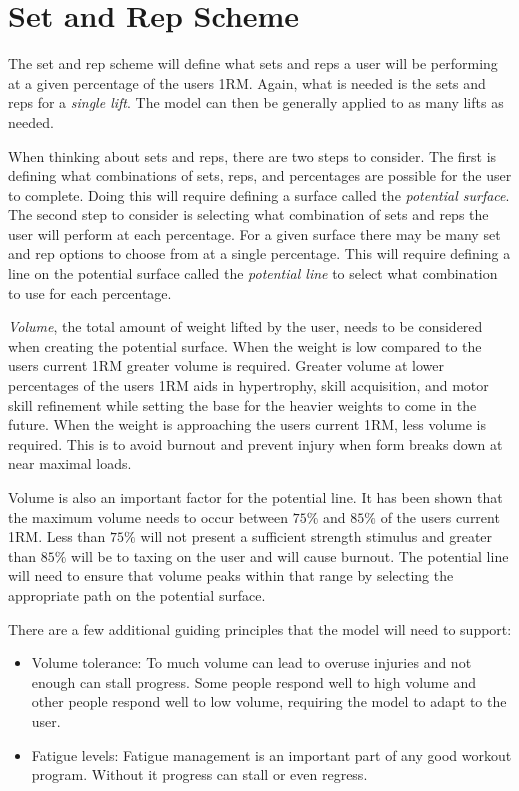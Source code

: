 \section{Set and Rep Scheme}

The set and rep scheme will define what sets and reps a user will be performing at a given percentage of the users 1RM. Again, what is needed is the sets and reps for a \textit{single lift}. The model can then be generally applied to as many lifts as needed.

When thinking about sets and reps, there are two steps to consider. The first is defining what combinations of sets, reps, and percentages are possible for the user to complete. Doing this will require defining a surface called the \textit{potential surface}. The second step to consider is selecting what combination of sets and reps the user will perform at each percentage. For a given surface there may be many set and rep options to choose from at a single percentage. This will require defining a line on the potential surface called the \textit{potential line} to select what combination to use for each percentage.

\textit{Volume}, the total amount of weight lifted by the user, needs to be considered when creating the potential surface. When the weight is low compared to the users current 1RM greater volume is required. Greater volume at lower percentages of the users 1RM aids in hypertrophy, skill acquisition, and motor skill refinement while setting the base for the heavier weights to come in the future. When the weight is approaching the users current 1RM, less volume is required. This is to avoid burnout and prevent injury when form breaks down at near maximal loads.

Volume is also an important factor for the potential line. It has been shown that the maximum volume needs to occur between $75\%$ and $85\%$ of the users current 1RM. Less than $75\%$ will not present a sufficient strength stimulus and greater than $85\%$ will be to taxing on the user and will cause burnout. The potential line will need to ensure that volume peaks within that range by selecting the appropriate path on the potential surface.

There are a few additional guiding principles that the model will need to support:
\begin{itemize}
    \item Volume tolerance: To much volume can lead to overuse injuries and not enough can stall progress. Some people respond well to high volume and other people respond well to low volume, requiring the model to adapt to the user.
    \item Fatigue levels: Fatigue management is an important part of any good workout program. Without it progress can stall or even regress.
\end{itemize}


